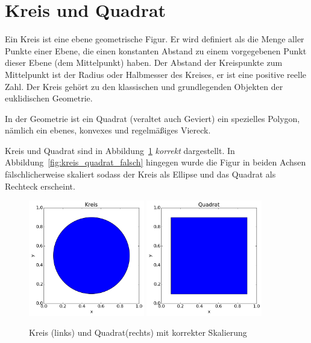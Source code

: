\documentclass[12pt,a4paper]{scrartcl}
\begin{document}
\section{Kreis und Quadrat}
Ein Kreis ist eine ebene geometrische Figur. Er wird definiert als die
Menge aller Punkte einer Ebene, die einen konstanten Abstand zu einem
vorgegebenen Punkt dieser Ebene (dem Mittelpunkt) haben. Der Abstand
der Kreispunkte zum Mittelpunkt ist der Radius oder Halbmesser des
Kreises, er ist eine positive reelle Zahl. Der Kreis gehört zu den
klassischen und grundlegenden Objekten der euklidischen Geometrie.

In der Geometrie ist ein Quadrat (veraltet auch Geviert) ein
spezielles Polygon, nämlich ein ebenes, konvexes und regelmäßiges
Viereck.

Kreis und Quadrat sind in Abbildung~\ref{fig:kreis_quadrat_korrekt}
\emph{korrekt} dargestellt. In
Abbildung~\ref{fig:kreis_quadrat_falsch} hingegen wurde die Figur in
beiden Achsen fälschlicherweise skaliert sodass der Kreis als Ellipse
und das Quadrat als Rechteck erscheint.
%
\begin{figure}[ht]
  \centering
  \includegraphics[width=0.45\textwidth]{kreis}
  \includegraphics[width=0.45\textwidth]{quadrat}
  \caption{Kreis (links) und Quadrat(rechts) mit korrekter Skalierung}
  \label{fig:kreis_quadrat_korrekt}
\end{figure}
\end{document}
